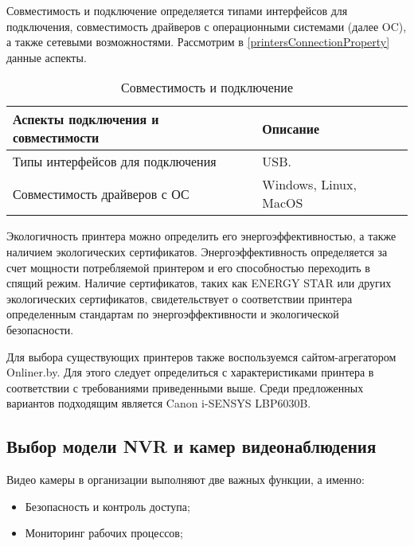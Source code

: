 Совместимость и подключение определяется типами интерфейсов для подключения, совместимость драйверов с операционными 
системами (далее OC), а также сетевыми возможностями.
Рассмотрим в \ref{printersConnectionProperty} данные аспекты.

\begin{table}[ht]
    \caption{Совместимость и подключение}
    \label{table:func:printersConnectionProperty}
    \begin{tabular}{| >{\raggedright}m{}
                    | >{\raggedright\arraybackslash}m{}|}
        \hline
        \centering Аспекты подключения и совместимости & \centering\arraybackslash Описание \\

        \hline
        Типы интерфейсов для подключения &
        USB.
        \\
        \hline
        Совместимость драйверов с ОС &
        Windows, Linux, MacOS
        \\
        \hline
    \end{tabular}
\end{table}

Экологичность принтера можно определить его энергоэффективностью, а также наличием экологических сертификатов. 
Энергоэффективность определяется за счет мощности потребляемой принтером и его способностью переходить в спящий режим. 
Наличие сертификатов, таких как ENERGY STAR или других экологических сертификатов, свидетельствует о соответствии принтера 
определенным стандартам по энергоэффективности и экологической безопасности.

Для выбора существующих принтеров также воспользуемся сайтом-агрегатором Onliner.by. Для этого следует определиться с характеристиками
принтера в соответствии с требованиями приведенными выше. Среди предложенных вариантов подходящим является Canon i-SENSYS LBP6030B.

\subsection{Выбор модели NVR и камер видеонаблюдения}

Видео камеры в организации выполняют две важных функции, а именно:
\begin{itemize}
    \item Безопасность и контроль доступа;
    \item Мониторинг рабочих процессов;
\end{itemize}


